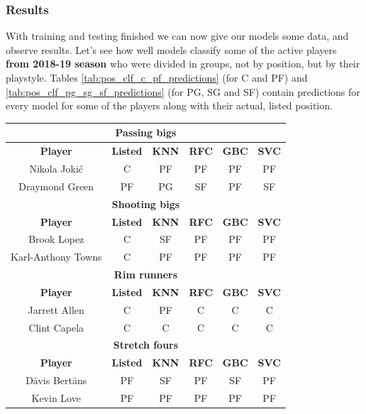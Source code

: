 \documentclass[a4paper]{article}
\begin{document}
\subsubsection{Results}
\label{subsubsec:pos_clf_res}

With training and testing finished we can now give our models some data, and observe results. Let's see how well models classify some of the active players \textbf{from 2018-19 season} who were divided in groups, not by position, but by their playstyle. Tables \ref{tab:pos_clf_c_pf_predictions} (for C and PF) and \ref{tab:pos_clf_pg_sg_sf_predictions} (for PG, SG and SF) contain predictions for every model for some of the players along with their actual, listed position.

\begin{table}[!h]
\begin{center}
\begin{tabular}{|c|c|c|c|c|c|} \hline
\multicolumn{6}{|c|}{\textbf{Passing bigs}} \\ \hline
\textbf{Player} & \textbf{Listed} & \textbf{KNN} & \textbf{RFC} & \textbf{GBC} & \textbf{SVC} \\ \hline
Nikola Jokić & C & PF & PF & PF & PF \\ \hline
Draymond Green & PF & PG & SF & PF & SF \\ \hline
\multicolumn{6}{|c|}{\textbf{Shooting bigs}} \\ \hline
\textbf{Player} & \textbf{Listed} & \textbf{KNN} & \textbf{RFC} & \textbf{GBC} & \textbf{SVC} \\ \hline
Brook Lopez & C & SF & PF  & PF & PF \\ \hline
Karl-Anthony Towns & C & PF  & PF & PF & PF  \\ \hline
\multicolumn{6}{|c|}{\textbf{Rim runners}} \\ \hline
\textbf{Player} & \textbf{Listed} & \textbf{KNN} & \textbf{RFC} & \textbf{GBC} & \textbf{SVC} \\ \hline
Jarrett Allen & C & PF & C & C & C  \\ \hline
Clint Capela & C & C & C & C & C \\ \hline
\multicolumn{6}{|c|}{\textbf{Stretch fours}} \\ \hline
\textbf{Player} & \textbf{Listed} & \textbf{KNN} & \textbf{RFC} & \textbf{GBC} & \textbf{SVC} \\ \hline
Dāvis Bertāns & PF & SF & PF & SF & PF \\ \hline
Kevin Love & PF & PF & PF & PF & PF \\ \hline

\end{tabular}
\end{center}
\end{table}
\end{document}
